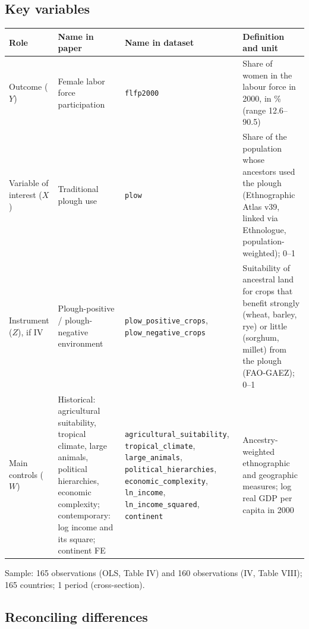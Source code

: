 \documentclass[12pt,a4paper]{article}
\renewcommand{\arraystretch}{1.25}
\begin{document}
\subsection{Key variables}

{\renewcommand{\arraystretch}{1.4}%
\begin{tabularx}{\textwidth}{@{}>{\raggedright\arraybackslash}p{}
  >{\raggedright\arraybackslash}p{}
>{\raggedright\arraybackslash}p{}
  L@{}}
\toprule
Role & Name in paper & Name in dataset & Definition and unit \\
\midrule
Outcome ($Y$) & Female labor force participation & \texttt{flfp2000} & Share of women in the labour force in 2000, in \% (range 12.6--90.5) \\
Variable of interest ($X$) & Traditional plough use & \texttt{plow} & Share of the population whose ancestors used the plough (Ethnographic Atlas v39, linked via Ethnologue, population-weighted); 0--1 \\
Instrument ($Z$), if IV & Plough-positive / plough-negative environment & \texttt{plow\_\allowbreak positive\_\allowbreak crops}, \texttt{plow\_\allowbreak negative\_\allowbreak crops} & Suitability of ancestral land for crops that benefit strongly (wheat, barley, rye) or little (sorghum, millet) from the plough (FAO-GAEZ); 0--1 \\
Main controls ($W$) & Historical: agricultural suitability, tropical climate, large animals, political hierarchies, economic complexity; contemporary: log income and its square; continent FE & \texttt{agricultural\_\allowbreak suitability}, \texttt{tropical\_\allowbreak climate}, \texttt{large\_\allowbreak animals}, \texttt{political\_\allowbreak hierarchies}, \texttt{economic\_\allowbreak complexity}, \texttt{ln\_\allowbreak income}, \texttt{ln\_\allowbreak income\_\allowbreak squared}, \texttt{continent} & Ancestry-weighted ethnographic and geographic measures; log real GDP per capita in 2000 \\
\bottomrule
\end{tabularx}}

\medskip\noindent
Sample: 165 observations (OLS, Table IV) and 160 observations (IV, Table VIII); 165 countries; 1 period (cross-section).

\subsection{Reconciling differences}
\end{document}
